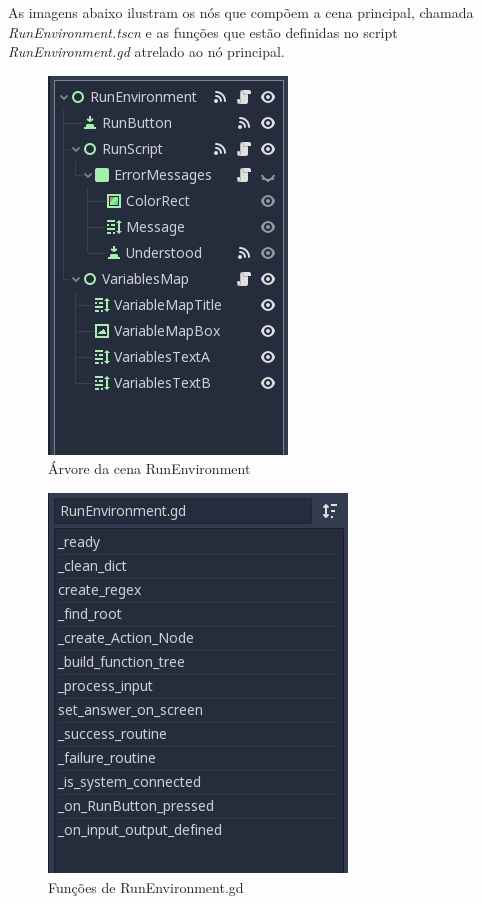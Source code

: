 As imagens abaixo ilustram os nós que compõem a cena principal, chamada 
\textit{RunEnvironment.tscn} e as funções que estão definidas no script
\textit{RunEnvironment.gd} atrelado ao nó principal.

\begin{minipage}[c]{0.5\textwidth}
    \begin{figure}[H]
        \includegraphics[scale=0.8]{../figuras/cena_RunEnvironment.png}
        \caption{Árvore da cena RunEnvironment}
    \end{figure}
\end{minipage}%
\begin{minipage}[c]{0.5\textwidth}
    \begin{figure}[H]
        \includegraphics[scale=0.8]{../figuras/funcoes_RunEnvironment.png}
        \caption{Funções de RunEnvironment.gd}
    \end{figure}
\end{minipage}

